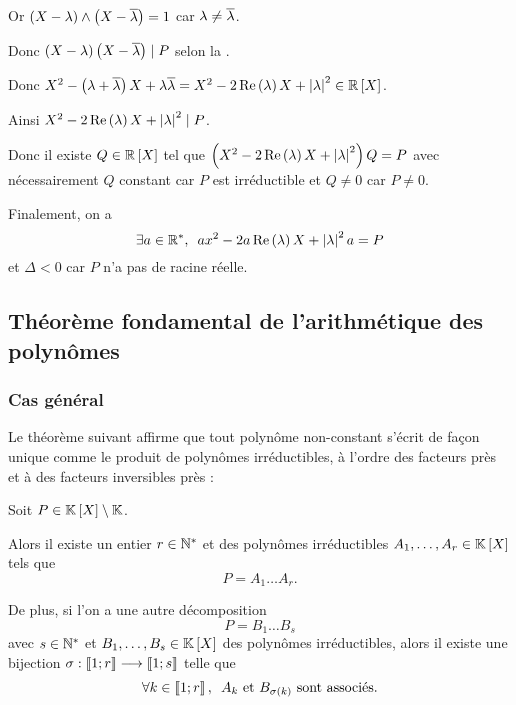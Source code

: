 \begin{dem}
Or \(\left(X-\lambda\right)\land\left(X-\overline{\lambda}\right)=1\) car \(\lambda\not=\overline{\lambda}\).

Donc \(\left(X-\lambda\right)\left(X-\overline{\lambda}\right)\mid P\) selon la .

Donc \(X^2-\paren{\lambda+\conj{\lambda}}X+\lambda\conj{\lambda}=X^2-2\Re\paren{\lambda}X+\abs{\lambda}^2\in\poly[\R]\).

Ainsi \(X^2-2\operatorname{Re}\left(\lambda\right)X+\left\lvert\lambda\right\rvert^2\mid P\).

Donc il existe \(Q\in\poly[\R]\) tel que \(\left(X^2-2\operatorname{Re}\left(\lambda\right)X+\left\lvert\lambda\right\rvert^2\right)Q=P\) avec nécessairement \(Q\) constant car \(P\) est irréductible et \(Q\not=0\) car \(P\not=0\).

Finalement, on a \[\quantifs{\exists a\in\Rs}ax^2-2a\Re\paren{\lambda}X+\abs{\lambda}^2a=P\] et \(\Delta<0\) car \(P\) n'a pas de racine réelle.
\end{dem}

\subsection{Théorème fondamental de l'arithmétique des polynômes}

\subsubsection{Cas général}

Le théorème suivant affirme que tout polynôme non-constant s'écrit de façon unique comme le produit de polynômes irréductibles, à l'ordre des facteurs près et à des facteurs inversibles près :

\begin{theo}
Soit \(P\in\poly\excluant\K\).

Alors il existe un entier \(r\in\mathbb{N}^*\) et des polynômes irréductibles \(A_1,\dots,A_r\in\poly\) tels que \[P=A_1\dots A_r.\]

De plus, si l'on a une autre décomposition \[P=B_1\dots B_s\] avec \(s\in\mathbb{N}^*\) et \(B_1,\dots,B_s\in\poly\) des polynômes irréductibles, alors il existe une bijection \(\sigma:\left\llbracket1;r\right\rrbracket\longrightarrow\left\llbracket1;s\right\rrbracket\) telle que \[\quantifs{\forall k\in\interventierii{1}{r}}A_k\text{ et }B_{\sigma\paren{k}}\text{ sont associés}.\]
\end{theo}

